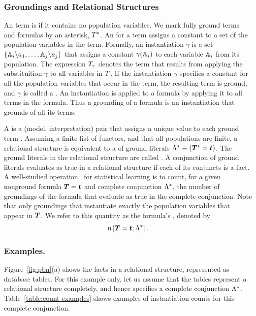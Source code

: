 \documentclass[runningheads,a4paper]{llncs}
\begin{document}
\subsubsection{Groundings and Relational Structures}
An term is  if it contains no population variables. We mark fully ground terms and formulas by an asterisk, $T^{*}\hspace{0.0ex}$. An   for a term assigns a constant to a set of the population variables in the term. Formally, an instantiation $\gamma$ is a set $\{\mathbb{A}_{i}\backslash a_{1},\ldots,\mathbb{A}_{j}\backslash a_{j}\}$ 
that assigns a constant $\gamma(\mathbb{A}_{i})$ to each variable $\mathbb{A}_{i}$ from its population. The expression $T_\gamma$ denotes the term that results from applying the substituition $\gamma$ to all variables in $T$. If the instantiation $\gamma$ specifies a constant for all the population variables that occur in the term, the resulting term is ground, and $\gamma$ is called a . An instantiation is applied to a formula by applying it to all terms in the formula. Thus a grounding of a formula is an instantiation that grounds of all its terms.


A  is a (model, interpretation) pair that assigns a unique value to each ground term \cite{Chiang2012}. Assuming a finite list of functors, and that all populations are finite, a relational structure is equivalent to a  of ground literals $\DB \equiv (\FG{\TF} = \TTuple)$. The ground literals in the relational structure are called . A conjunction of ground literals evaluates as true in a relational structure if each of its conjuncts is a fact. A well-studied operation~\cite{Schulte2013} for statistical learning is to count, for a given nonground formula $\TF = \TTuple$ and complete conjunction $\Lambda^{*}\hspace{0.0ex}$, the number of groundings of the formula that evaluate as true in the complete conjunction. Note that only groundings that instantiate exactly the population variables that appear in $\TF$. We refer to this quantity as the formula's , denoted by $$\Count{\TF = \TTuple}{\DB}.$$

\subsubsection{Examples.}

Figure~\ref{fig:pbn}(a) shows the facts in a relational structure, represented as database tables. For this example only, let us assume that the tables represent a relational structure completely, and hence specifies a complete conjunction $\Lambda^{*}\hspace{0.0ex}$. Table~\ref{table:count-examples} shows examples of instantiation counts for this complete conjunction.
\end{document}
